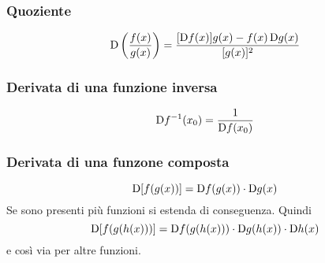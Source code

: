 \subsubsection{Quoziente}
\begin{equation*}
  \mathop{}\!\mathrm{D} \left( \frac{f(x)}{g(x)} \right) = \frac{[\mathop{}\!\mathrm{D} f(x)]g(x)-f(x)\mathop{}\!\mathrm{D} g(x)}{[g(x)]^2}
\end{equation*}

\subsubsection{Derivata di una funzione inversa}
\begin{equation*}
  \mathop{}\!\mathrm{D} f^{-1}(x_0) = \frac{1}{\mathop{}\!\mathrm{D} f(x_0)}
\end{equation*}

\subsubsection{Derivata di una funzone composta}
\begin{equation*}
  \mathop{}\!\mathrm{D} [f(g(x))] = \mathop{}\!\mathrm{D} f(g(x))\cdot\mathop{}\!\mathrm{D} g(x)
\end{equation*}
Se sono presenti più funzioni si estenda di conseguenza. Quindi
\begin{equation*}
  \mathop{}\!\mathrm{D} [f(g(h(x)))] = \mathop{}\!\mathrm{D} f(g(h(x)))\cdot\mathop{}\!\mathrm{D} g(h(x))\cdot\mathop{}\!\mathrm{D} h(x)
\end{equation*}
e così via per altre funzioni.

